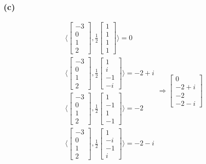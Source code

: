 \documentclass{article}
\begin{document}
\subsubsection*{(c)}
\begin{equation*}
    \begin{split}
        & \langle
        \begin{bmatrix}
            -3 \\ 0 \\ 1 \\ 2
        \end{bmatrix}, \frac{1}{2} \begin{bmatrix}
            1 \\ 1 \\ 1 \\ 1
        \end{bmatrix}
        \rangle = 0 \\
        & \langle
        \begin{bmatrix}
            -3 \\ 0 \\ 1 \\ 2
        \end{bmatrix}, \frac{1}{2} \begin{bmatrix}
            1 \\ i \\ -1 \\ -i
        \end{bmatrix}
        \rangle = -2 + i \\
        & \langle
        \begin{bmatrix}
            -3 \\ 0 \\ 1 \\ 2
        \end{bmatrix}, \frac{1}{2} \begin{bmatrix}
            1 \\ -1 \\ 1 \\ -1
        \end{bmatrix}
        \rangle = -2 \\
        & \langle
        \begin{bmatrix}
            -3 \\ 0 \\ 1 \\ 2
        \end{bmatrix}, \frac{1}{2} \begin{bmatrix}
            1 \\ -i \\ -1 \\ i
        \end{bmatrix}
        \rangle = -2 - i
    \end{split}
    \Rightarrow \begin{bmatrix}
        0 \\ -2 + i \\ -2 \\ -2 - i
    \end{bmatrix}
\end{equation*}
\end{document}
